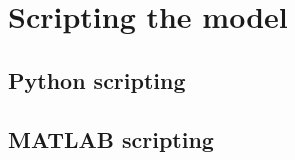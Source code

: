 \newpage
\section{Scripting the model}

\subsection{Python scripting}

\subsection{MATLAB scripting}

